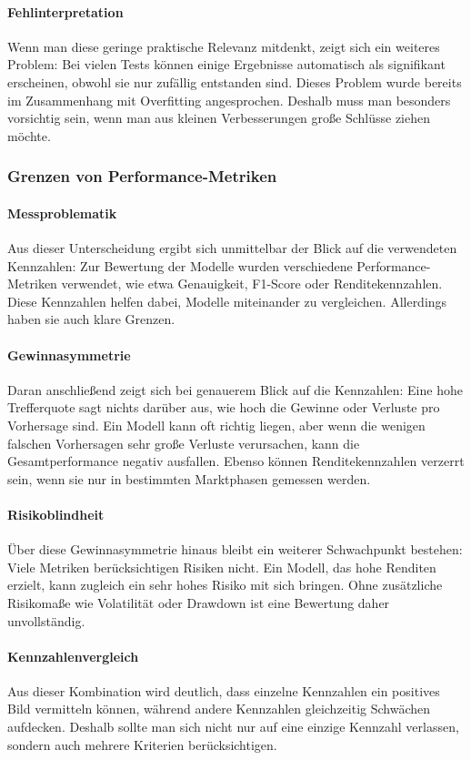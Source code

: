 \paragraph{Fehlinterpretation}
Wenn man diese geringe praktische Relevanz mitdenkt, zeigt sich ein weiteres Problem: Bei vielen Tests können einige Ergebnisse automatisch als signifikant erscheinen, obwohl sie nur zufällig entstanden sind. Dieses Problem wurde bereits im Zusammenhang mit Overfitting angesprochen. Deshalb muss man besonders vorsichtig sein, wenn man aus kleinen Verbesserungen große Schlüsse ziehen möchte.

\subsubsection{Grenzen von Performance-Metriken}
\paragraph{Messproblematik}
Aus dieser Unterscheidung ergibt sich unmittelbar der Blick auf die verwendeten Kennzahlen: Zur Bewertung der Modelle wurden verschiedene Performance-Metriken verwendet, wie etwa Genauigkeit, F1-Score oder Renditekennzahlen. Diese Kennzahlen helfen dabei, Modelle miteinander zu vergleichen. Allerdings haben sie auch klare Grenzen.
\paragraph{Gewinnasymmetrie}
Daran anschließend zeigt sich bei genauerem Blick auf die Kennzahlen: Eine hohe Trefferquote sagt nichts darüber aus, wie hoch die Gewinne oder Verluste pro Vorhersage sind. Ein Modell kann oft richtig liegen, aber wenn die wenigen falschen Vorhersagen sehr große Verluste verursachen, kann die Gesamtperformance negativ ausfallen. Ebenso können Renditekennzahlen verzerrt sein, wenn sie nur in bestimmten Marktphasen gemessen werden.
\paragraph{Risikoblindheit}
Über diese Gewinnasymmetrie hinaus bleibt ein weiterer Schwachpunkt bestehen: Viele Metriken berücksichtigen Risiken nicht. Ein Modell, das hohe Renditen erzielt, kann zugleich ein sehr hohes Risiko mit sich bringen. Ohne zusätzliche Risikomaße wie Volatilität oder Drawdown ist eine Bewertung daher unvollständig.
\paragraph{Kennzahlenvergleich}
Aus dieser Kombination wird deutlich, dass einzelne Kennzahlen ein positives Bild vermitteln können, während andere Kennzahlen gleichzeitig Schwächen aufdecken. Deshalb sollte man sich nicht nur auf eine einzige Kennzahl verlassen, sondern auch mehrere Kriterien berücksichtigen.

